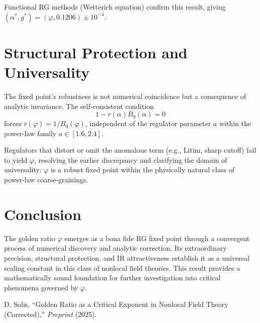 \documentclass[14pt, a4paper]{extarticle}
\begin{document}
Functional RG methods (Wetterich equation) confirm this result, giving $(\alpha^*, g^*) = (\varphi, 0.1206) \pm 10^{-4}$.

\section{Structural Protection and Universality}

The fixed point's robustness is not numerical coincidence but a consequence of analytic invariance. The self-consistent condition
\[
1 - r(\alpha) B_0(\alpha) = 0
\]
forces $r(\varphi) = 1/B_0(\varphi)$, independent of the regulator parameter $a$ within the power-law family $a \in [1.6, 2.4]$.

Regulators that distort or omit the anomalous term (e.g., Litim, sharp cutoff) fail to yield $\varphi$, resolving the earlier discrepancy and clarifying the domain of universality: $\varphi$ is a robust fixed point within the physically natural class of power-law coarse-grainings.

\section{Conclusion}

The golden ratio $\varphi$ emerges as a bona fide RG fixed point through a convergent process of numerical discovery and analytic correction. Its extraordinary precision, structural protection, and IR attractiveness establish it as a universal scaling constant in this class of nonlocal field theories. This result provides a mathematically sound foundation for further investigation into critical phenomena governed by $\varphi$.

\begin{thebibliography}{9}
 D. Solis, ``Golden Ratio as a Critical Exponent in Nonlocal Field Theory (Corrected),'' \textit{Preprint} (2025).
\end{thebibliography}
\end{document}
